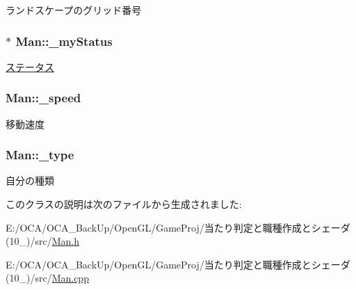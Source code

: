 ランドスケープのグリッド番号 

\hypertarget{class_man_ae884f4872be46582eac86e05d47ac52f}{
\subsubsection[{\-\_\-my\-Status}]{$\ast$ Man\-::\-\_\-my\-Status\hspace{0.3cm}{\ttfamily [protected]}}}\label{class_man_ae884f4872be46582eac86e05d47ac52f}


\hyperlink{struct_xE3_x82_xB9_xE3_x83_x86_xE3_x83_xBC_xE3_x82_xBF_xE3_x82_xB9}{ステータス} 

\hypertarget{class_man_ab6179d5c87983400d4d6cdd7d0163d86}{
\subsubsection[{\-\_\-speed}]{ Man\-::\-\_\-speed\hspace{0.3cm}{\ttfamily [protected]}}}\label{class_man_ab6179d5c87983400d4d6cdd7d0163d86}


移動速度 

\hypertarget{class_man_abd30d75b28d7c06673a676c6d7f8c36e}{
\subsubsection[{\-\_\-type}]{ Man\-::\-\_\-type\hspace{0.3cm}{\ttfamily [protected]}}}\label{class_man_abd30d75b28d7c06673a676c6d7f8c36e}


自分の種類 



このクラスの説明は次のファイルから生成されました\-:\begin{DoxyCompactItemize}
\item 
E\-:/\-O\-C\-A/\-O\-C\-A\-\_\-\-Back\-Up/\-Open\-G\-L/\-Game\-Proj/当たり判定と職種作成とシェーダ(10\-\_)/src/\hyperlink{_man_8h}{Man.\-h}\item 
E\-:/\-O\-C\-A/\-O\-C\-A\-\_\-\-Back\-Up/\-Open\-G\-L/\-Game\-Proj/当たり判定と職種作成とシェーダ(10\-\_)/src/\hyperlink{_man_8cpp}{Man.\-cpp}\end{DoxyCompactItemize}
